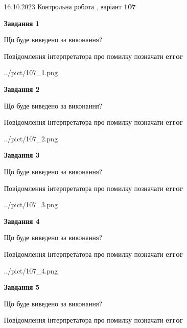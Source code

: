 \documentclass[12pt, ukrainian]{article}
\begin{document}
{\Large{16.10.2023 Контрольна робота , варіант  \No \textbf { 107 }\par}}
{
\begin {large}
{\begin {center}\textbf{Завдання 1}\end {center}}\par
Що буде виведено за виконання? \par
Повідомлення інтерпретатора про помилку позначати \textbf{error}

\begin{center}
	{../pict/107_1.png}
\end{center}
\newpage

{\begin {center}\textbf{Завдання 2}\end {center}}\par
Що буде виведено за виконання? \par
Повідомлення інтерпретатора про помилку позначати \textbf{error}

\begin{center}
	{../pict/107_2.png}
\end{center}
\newpage

{\begin {center}\textbf{Завдання 3}\end {center}}\par
Що буде виведено за виконання? \par
Повідомлення інтерпретатора про помилку позначати \textbf{error}

\begin{center}
	{../pict/107_3.png}
\end{center}
\newpage

{\begin {center}\textbf{Завдання 4}\end {center}}\par
Що буде виведено за виконання? \par
Повідомлення інтерпретатора про помилку позначати \textbf{error}

\begin{center}
	{../pict/107_4.png}
\end{center}
\newpage

{\begin {center}\textbf{Завдання 5}\end {center}}\par
Що буде виведено за виконання? \par
Повідомлення інтерпретатора про помилку позначати \textbf{error}


\end{large}}
\end{document}
